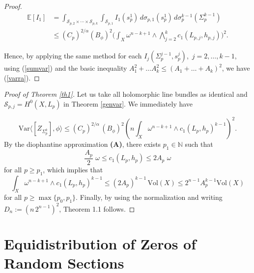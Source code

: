 \documentclass[11pt,leqno,oneside]{amsart}
\numberwithin{equation}{section}
\begin{document}
\begin{proof}
\begin{equation}\label{ei1}
\begin{aligned}
\mathbb{E}[I_1]
&=\int_{\mathcal{S}_{p, 2}\times\cdots\times\mathcal{S}_{p, k}}
\int_{\mathcal{S}_{p,1}} I_1(s_p^{1})\,d\sigma_{p, 1}(s_p^{1})\,d\sigma_p^{k-1}(\Sigma_p^{k-1}) \\
&\le (C_p)^{2/\alpha}(B_\phi)^{2}
\Bigg(\int_X \omega^{n-k+1}\wedge \bigwedge_{j=2}^{k}c_1(L_{p, j},h_{p, j})\Bigg)^{2}.
\end{aligned}
\end{equation}




Hence, by applying the same method for each $I_{j}(\Sigma_p^{j-1},s^{j}_{p})$,\, $j=2, \ldots, k-1$, using (\ref{sumvar}) and the basic inequality $A_{1}^2 + \ldots A^{2}_{k} \leq (A_{1} + \ldots + A_{k})^{2}$, we have (\ref{varra}). 
\end{proof}





 \begin{proof}[Proof of Theorem \ref{th1}]
 Let us take all holomorphic line bundles as identical and $\mathcal{S}_{p, j}= H^{0}(X, L_{p})$ in Theorem \ref{genvar}. We immediately have

 \begin{equation} \label{spevar}
  \mathrm{Var} \langle [Z_{\Sigma_{p}^{k}}], \phi \rangle \leq (C_{p})^{2/\alpha}\,(B_{\phi})^{2}(n \int_{X}{\omega^{n-k+1} \wedge c_{1}(L_{p}, h_{p})^{k-1}})^{2}.
 \end{equation}By the diophantine approximation \textbf{(A)}, there exists $p_{1} \in \mathbb{N}$ such that
 \begin{equation*}\label{cur1}\frac{A_{p}}{2}\,\, \omega \leq c_{1}(L_{p}, h_{p}) \leq 2A_{p}\,\, \omega \end{equation*} for all $p \geq p_{1}$, which implies that \begin{equation}\label{voll}\int_{X}{\omega^{n-k+1}\wedge c_{1}(L_{p}, h_{p})^{k-1}}\leq (2A_{p})^{k-1} \,\mathrm{Vol}(X) \leq 2^{n-1} A^{k-1}_{p} \mathrm{Vol}(X)\end{equation} for all $p \geq \max\{p_0, p_1\}$. Finally, by using the normalization and writing $D_{n}:= (n \,2^{n-1})^{2}$, Theorem 1.1 follows.

 \end{proof}





\section{Equidistribution of Zeros of Random Sections}
\end{document}
